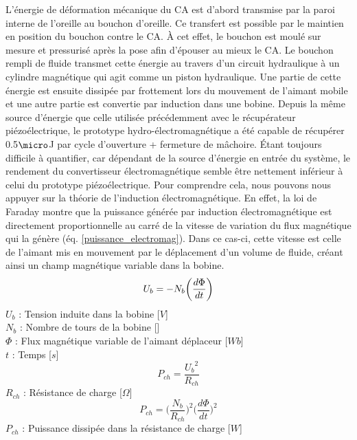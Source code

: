L'énergie de déformation mécanique du CA est d'abord transmise par la paroi interne de l'oreille au bouchon d'oreille. Ce transfert est possible par le maintien en position du bouchon contre le CA. À cet effet, le bouchon est moulé sur mesure et pressurisé après la pose afin d'épouser au mieux le CA. Le bouchon rempli de fluide transmet cette énergie au travers d'un circuit hydraulique à un cylindre magnétique qui agit comme un piston hydraulique. Une partie de cette énergie est ensuite dissipée par frottement lors du mouvement de l'aimant mobile et une autre partie est convertie par induction dans une bobine. Depuis la même source d'énergie que celle utilisée précédemment avec le récupérateur piézoélectrique, le prototype hydro-électromagnétique a été capable de récupérer 0.5$\micro$J par cycle d'ouverture + fermeture de mâchoire. Étant toujours difficile à quantifier, car dépendant de la source d'énergie en entrée du système, le rendement du convertisseur électromagnétique semble être nettement inférieur à celui du prototype piézoélectrique. Pour comprendre cela, nous pouvons nous appuyer sur la théorie de l'induction électromagnétique. En effet, la loi de Faraday montre que la puissance générée par induction électromagnétique est directement proportionnelle au carré de la vitesse de variation du flux magnétique qui la génère (éq. \ref{puissance_electromag}). Dans ce cas-ci, cette vitesse est celle de l'aimant mis en mouvement par le déplacement d'un volume de fluide, créant ainsi un champ magnétique variable dans la bobine.
\begin{equation}
	U_b = -N_b\biggl(\frac{d\Phi}{dt} \biggr)\\
	\label{faraday}
\end{equation}
	$U_b$ : Tension induite dans la bobine [$V$]\\
	$N_b$ : Nombre de tours de la bobine []\\
	$\Phi$ : Flux magnétique variable de l'aimant déplaceur [$Wb$]\\
	$t$ : Temps [$s$]\\
\begin{equation}
	P_{ch} = \frac{{U_b}^2}{R_{ch}}
	\label{puissance_UR}
\end{equation}	
	$R_{ch}$ : Résistance de charge [$\Omega$]\\
\begin{equation}
	P_{ch} = \biggl( \frac{{N_b}}{R_{ch}} \biggr)^2
			 \biggl( \frac{d\Phi}{dt} \biggr)^2
	\label{puissance_electromag}
\end{equation}	
	$P_{ch}$ : Puissance dissipée dans la résistance de charge [$W$]\\
